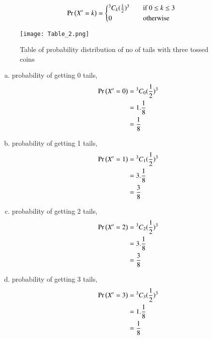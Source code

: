 \documentclass[journal,12pt,twocolumn]{IEEEtran}
\begin{document}
\begin{enumerate}[(i)]
\begin{align}
   \pr{X'=k} =
  \begin{cases*}
    {^3 C_k}(\frac{1}{2})^{3} \quad& if $0 \leq k \leq 3$ \\
    0 \quad& otherwise
  \end{cases*}
\end{align}

\begin{figure}[h!]
    \centering
    \texttt{[image: Table\_2.png]}
    \caption{Table of probability distribution of no of tails with three tossed coins}
    \label{fig:Table_2}
\end{figure}

\begin{enumerate}[(a)]
\item probability of getting 0 tails,
    \begin{align}
        \begin{split}
            \Pr\left(X'=0\right) &= {^3C_0}(\frac{1}{2})^3\\
            &=1.\frac{1}{8}\\
            &=\frac{1}{8}
        \end{split}
    \end{align}

\item probability of getting 1 tails,
    \begin{align}
        \begin{split}
            \Pr\left(X'=1\right) &= {^3C_1}(\frac{1}{2})^3\\
            &=3.\frac{1}{8}\\
            &=\frac{3}{8}
        \end{split}
    \end{align}

\item probability of getting 2 tails,
    \begin{align}
        \begin{split}
            \Pr\left(X'=2\right) &= {^3C_2}(\frac{1}{2})^3\\
            &=3.\frac{1}{8}\\
            &=\frac{3}{8}
        \end{split}
    \end{align}

\item probability of getting 3 tails,
    \begin{align}
        \begin{split}
            \Pr\left(X'=3\right) &= {^3C_3}(\frac{1}{2})^3\\
            &=1.\frac{1}{8}\\
            &=\frac{1}{8}
        \end{split}
    \end{align}
\end{enumerate}


\end{enumerate}
\end{document}
